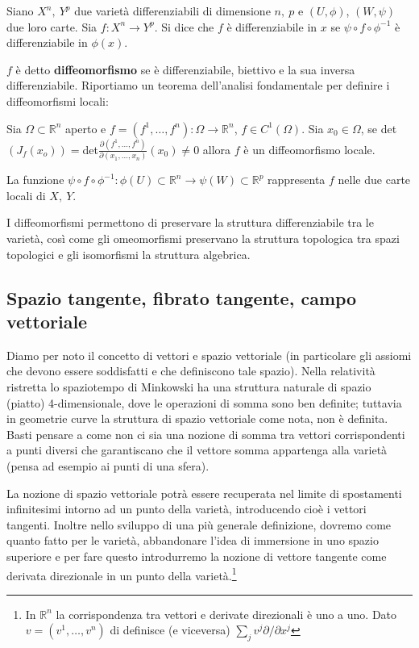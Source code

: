 \begin{definizione}
Siano $X^n, \ Y^p$ due varietà differenziabili di dimensione $n, \ p$ e $(U, \phi)$, $(W, \psi)$ due loro carte.
Sia $f: X^n \rightarrow Y^p$.
Si dice che $f$ è differenziabile in $x$ se $\psi \circ f \circ \phi^{-1}$ è differenziabile in $\phi(x)$.

$f$ è detto \textbf{diffeomorfismo} se è differenziabile, biettivo e la sua inversa differenziabile.
Riportiamo un teorema dell'analisi fondamentale per definire i diffeomorfismi locali:
\begin{teorema}
Sia $\Omega \subset \mathbb{R}^n$ aperto e $f=(f^1,\dots, f^n) :  \Omega \rightarrow \mathbb{R}^n$, $f\in C^1(\Omega)$. Sia $x_0 \in \Omega$, se det$(J_f(x_o))=$det$\frac{\partial(f^1,\dots, f^n)}{\partial(x_1,\dots, x_n)}(x_0)\neq 0$ allora $f$ è un diffeomorfismo locale.
\end{teorema}

\end{definizione}
La funzione $\psi \circ f \circ \phi^{-1}: \phi(U)\subset\mathbb{R}^n \rightarrow \psi(W)\subset\mathbb{R}^p$ rappresenta $f$ nelle due carte locali di $X, \ Y$.

I diffeomorfismi permettono di preservare la struttura differenziabile tra le varietà, così come gli omeomorfismi preservano la struttura topologica tra spazi topologici e gli isomorfismi la struttura algebrica.


\subsection{Spazio tangente, fibrato tangente, campo vettoriale}
Diamo per noto il concetto di vettori e spazio vettoriale (in particolare gli assiomi che devono essere soddisfatti e che definiscono tale spazio). Nella relatività ristretta lo spaziotempo di Minkowski ha una struttura naturale di spazio (piatto) 4-dimensionale, dove le operazioni di somma sono ben definite; tuttavia in geometrie curve la struttura di spazio vettoriale come nota, non è definita. Basti pensare a come non ci sia una nozione di somma tra vettori corrispondenti a punti diversi che garantiscano che il vettore somma appartenga alla varietà (pensa ad esempio ai punti di una sfera).

La nozione di spazio vettoriale potrà essere recuperata nel limite di spostamenti infinitesimi intorno ad un punto della varietà, introducendo cioè i vettori tangenti.
Inoltre nello sviluppo di una più generale definizione, dovremo come quanto fatto per le varietà, abbandonare l'idea di immersione in uno spazio superiore e per fare questo introdurremo la nozione di vettore tangente come derivata direzionale in un punto della varietà.\footnote{In $\mathbb{R}^n$ la corrispondenza tra vettori e derivate direzionali è uno a uno. Dato $v=(v^1,\dots, v^n)$ di definisce (e viceversa) $\sum_jv^j\partial/\partial x^j$}

